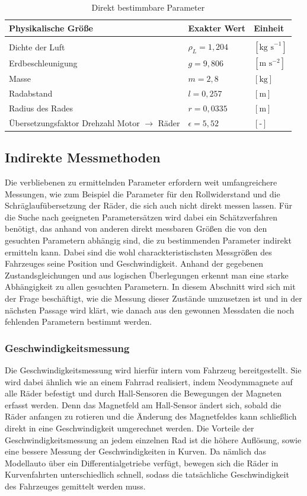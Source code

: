 \begin{table}[H]
\centering
\begin{tabularx}{\columnwidth}{p{8cm}|p{4cm}|p{4cm}}
  \textbf{Physikalische Größe} & \textbf{Exakter Wert}& \textbf{Einheit}\\\hline\hline 
	\rule{0pt}{1mm} & &\\
	Dichte der Luft & $\rho_{L}=1,204$ & $[\text{kg s}^{-1} ]$\\
	Erdbeschleunigung& $g=9,806$ & $[\text{m s}^{-2}]$\\
	Masse& $m=2,8$ & $[\text{kg}]$\\
  	Radabstand& $l=0,257$ & $[\text{m}]$\\
	Radius des Rades & $r=0,0335$ & $[\text{m}]$\\
	Übersetzungsfaktor Drehzahl Motor $\rightarrow$ Räder  & $\epsilon=5,52$ & $[\text{-}]$
\end{tabularx}
\caption{Direkt bestimmbare Parameter \label{tab:Pardir}}
\end{table} 
\subsection{Indirekte Messmethoden}
Die verbliebenen zu ermittelnden Parameter erfordern weit umfangreichere Messungen, wie zum Beispiel die Parameter für den Rollwiderstand und die Schräglaufübersetzung der Räder, die sich auch nicht direkt messen lassen. Für die Suche nach geeigneten Parametersätzen wird dabei ein Schätzverfahren benötigt, das anhand von anderen direkt messbaren Größen die von den gesuchten Parametern abhängig sind, die zu bestimmenden Parameter indirekt ermitteln kann. Dabei sind die wohl charackteristischsten Messgrößen des Fahrzeuges seine Position und Geschwindigkeit. Anhand der gegebenen Zustandsgleichungen und aus logischen Überlegungen erkennt man eine starke Abhängigkeit zu allen gesuchten Parametern. In diesem Abschnitt wird sich mit der Frage beschäftigt, wie die Messung dieser Zustände umzusetzen ist und in der nächsten Passage wird klärt, wie danach aus den gewonnen Messdaten die noch fehlenden Parametern bestimmt werden.
\subsubsection{Geschwindigkeitsmessung}
Die Geschwindigkeitsmessung wird hierfür intern vom Fahrzeug bereitgestellt. Sie wird dabei ähnlich wie an einem Fahrrad realisiert, indem Neodymmagnete auf alle Räder befestigt und durch Hall-Sensoren die Bewegungen der Magneten erfasst werden. Denn das Magnetfeld am Hall-Sensor ändert sich, sobald die Räder anfangen zu rotieren und die Änderung des Magnetfeldes kann schließlich direkt in eine Geschwindigkeit umgerechnet werden. Die Vorteile der Geschwindigkeitsmessung an jedem einzelnen Rad ist die höhere Auflösung, sowie eine bessere Messung der Geschwindigkeiten in Kurven. Da nämlich das Modellauto über ein Differentialgetriebe verfügt, bewegen sich die Räder in Kurvenfahrten unterschiedlich schnell, sodass die tatsächliche Geschwindigkeit des Fahrzeuges gemittelt werden muss.
